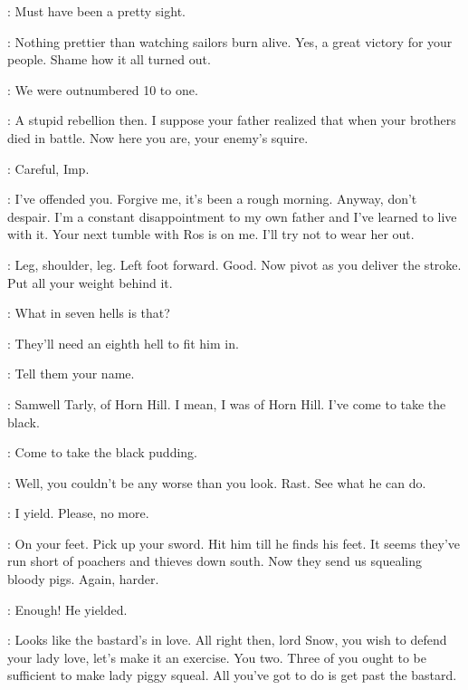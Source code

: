 \THEON: Must have been a pretty sight. 

\TYRION: Nothing prettier than watching sailors burn alive. Yes, a great victory for your people. Shame how it all turned out. 

\THEON: We were outnumbered 10 to one. 

\TYRION: A stupid rebellion then. I suppose your father realized that when your brothers died in battle. Now here you are, your enemy's squire. 

\THEON: Careful, Imp. 

\TYRION: I've offended you. Forgive me, it's been a rough morning. Anyway, don't despair. I'm a constant disappointment to my own father and I've learned to live with it.  Your next tumble with Ros is on me. I'll try not to wear her out. 

\scene



\JON: Leg, shoulder, leg. Left foot forward. Good. Now pivot as you deliver the stroke. Put all your weight behind it. 


\GRENN: What in seven hells is that? 

\PYP: They'll need an eighth hell to fit him in. 

\ALLISER: Tell them your name. 

\SAM: Samwell Tarly, of Horn Hill. I mean, I was of Horn Hill. I've come to take the black. 

\RAST: Come to take the black pudding. 

\ALLISER: Well, you couldn't be any worse than you look. Rast. See what he can do. 


\SAM: I yield. Please, no more. 

\ALLISER: On your feet. Pick up your sword.  Hit him till he finds his feet. It seems they've run short of poachers and thieves down south. Now they send us squealing bloody pigs. Again, harder. 


\JON: Enough! He yielded. 

\ALLISER: Looks like the bastard's in love. All right then, lord Snow, you wish to defend your lady love, let's make it an exercise. You two. Three of you ought to be sufficient to make lady piggy squeal. All you've got to do is get past the bastard. 

